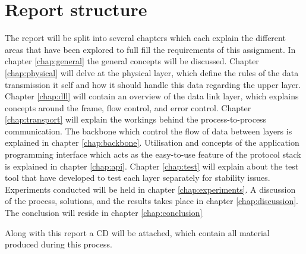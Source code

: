 \section{Report structure}
The report will be split into several chapters which each explain the different areas that have been explored to full fill the requirements of this assignment. In chapter \ref{chap:general} the general concepts will be discussed. Chapter \ref{chap:physical} will delve at the physical layer, which define the rules of the data transmission it self and how it should handle this data regarding the upper layer. Chapter \ref{chap:dll} will contain an overview of the data link layer, which explains concepts around the frame, flow control, and error control. Chapter \ref{chap:transport} will explain the workings behind the process-to-process communication. The backbone which control the flow of data between layers is explained in chapter \ref{chap:backbone}. Utilisation and concepts of the application programming interface which acts as the easy-to-use feature of the protocol stack is explained in chapter \ref{chap:api}. Chapter \ref{chap:test} will explain about the test tool that have developed to test each layer separately for stability issues. Experiments conducted will be held in chapter \ref{chap:experiments}. A discussion of the process, solutions, and the results takes place in chapter \ref{chap:discussion}. The conclusion will reside in chapter \ref{chap:conclusion}

Along with this report a CD will be attached, which contain all material produced during this process.